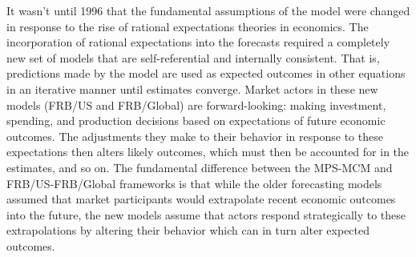 \documentclass[a4paper]{article}\usepackage[]{graphicx}\usepackage[]{color}
\begin{document}
It wasn't until 1996 that the fundamental assumptions of the model were changed in response to the rise of rational expectations theories in economics. The incorporation of rational expectations into the forecasts required a completely new set of models that are self-referential and internally consistent. That is, predictions made by the model are used as expected outcomes in other equations in an iterative manner until estimates converge. Market actors in these new models (FRB/US and FRB/Global) are forward-looking: making investment, spending, and production decisions based on expectations of future economic outcomes. The adjustments they make to their behavior in response to these expectations then alters likely outcomes, which must then be accounted for in the estimates, and so on. The fundamental difference between the MPS-MCM and FRB/US-FRB/Global frameworks is that while the older forecasting models assumed that market participants would extrapolate recent economic outcomes into the future, the new models assume that actors respond strategically to these extrapolations by altering their behavior which can in turn alter expected outcomes.  
\end{document}

